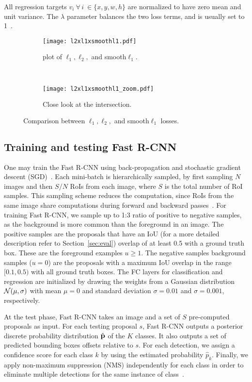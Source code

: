 All regression targets $v_i~\forall\, i \ \in \{x,y,w,h\}$ are normalized to have zero mean and unit variance.
The $\lambda$ parameter balances the two loss terms, and is usually set to 1~\cite{Girshick2015}.
%
\begin{figure}[th!]
  \centering
  \begin{subfigure}[t]{0.49\linewidth}
    \centering
    \texttt{[image: l2xl1xsmoothl1.pdf]}
    \caption{plot of $\ell_1, \ell_2,$ and smooth$\ell_1$.}
  \end{subfigure}~
  \begin{subfigure}[t]{0.49\linewidth}
    \centering
    \texttt{[image: l2xl1xsmoothl1\_zoom.pdf]}
    \caption{Close look at the intersection.}
  \end{subfigure}
  \caption{Comparison between $\ell_1, \ell_2,$ and smooth$\ell_1$ losses.}
  \label{fig:l1_loss}
\end{figure}

\subsection{Training and testing Fast R-CNN}\label{sec:train_fast_rcnn}
%
One may train the Fast R-CNN using back-propagation and stochastic gradient descent (SGD)~\cite{LeCun1989}.
Each mini-batch is hierarchically sampled, by first sampling $N$ images and then $S/N$ RoIs from each image, where $S$ is the total number of RoI samples.
This sampling scheme reduces the computation, since RoIs from the same image share computations during forward and backward passes~\cite{Girshick2015}.
For training Fast R-CNN, we sample up to 1:3 ratio of positive to negative samples, as the background is more common than the foreground in an image.
The positive samples are the proposals that have an IoU (for a more detailed description refer to Section~\ref{sec:eval}) overlap of at least 0.5 with a ground truth box.
These are the foreground examples \ie $u\geq1$.
The negative samples \ie background samples ($u=0$) are the proposals with a maximum IoU overlap in the range $[0.1, 0.5)$ with all ground truth boxes.
The FC layers for classification and regression are initialized by drawing the weights from a Gaussian distribution $\mathcal{N}(\mu, \sigma)$ with mean $\mu=0$ and standard deviation $\sigma=0.01$ and $\sigma=0.001$, respectively.

At the test phase, Fast R-CNN takes an image and a set of $S$ pre-computed proposals as input.
For each testing proposal $s$, Fast R-CNN outputs a posterior discrete probability distribution $\hat {\mathbf{p}}$ of the $K$ classes.
It also outputs a set of predicted bounding boxes offsets relative to $s$.
For each detection, we assign a confidence score for each class $k$ by using the estimated probability $\hat p_k$.
Finally, we apply non-maximum suppression (NMS)
independently for each class in order to eliminate multiple detections for the same instance of class~\cite{Girshick2016RCNN}.

